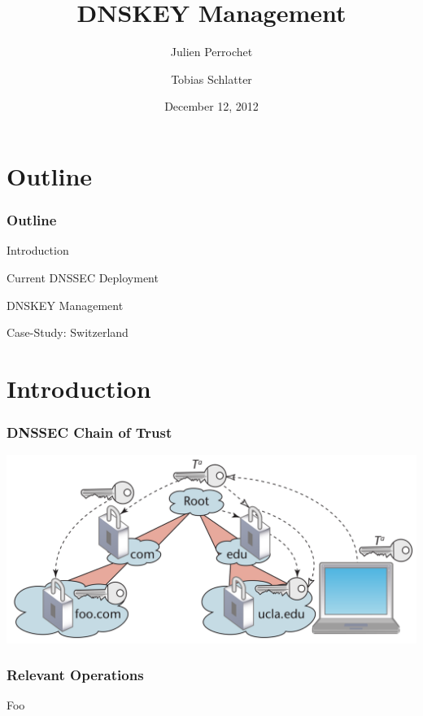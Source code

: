 \documentclass{beamer}
\title{DNSKEY Management}
\author{Julien Perrochet \and Tobias Schlatter}
\date{December 12, 2012}
\institute{ITSEC, EPFL, Prof. Janson}
\begin{document}
\begin{frame}
  \titlepage
\end{frame}

\section{Outline}
\begin{frame}
  \frametitle{Outline}

  \begin{block}{Introduction}
  \end{block}

  \begin{block}{Current DNSSEC Deployment}
  \end{block}

  \begin{block}{DNSKEY Management}
  \end{block}

  \begin{block}{Case-Study: Switzerland}
  \end{block}

\end{frame}

\section{Introduction}
\begin{frame}
  \frametitle{DNSSEC Chain of Trust}

  \includegraphics[width=\textwidth]{trust-chain}

\end{frame}

\begin{frame}
  \frametitle{Relevant Operations}

  \begin{block}{Foo}

  \end{block}

\end{frame}
\end{document}
